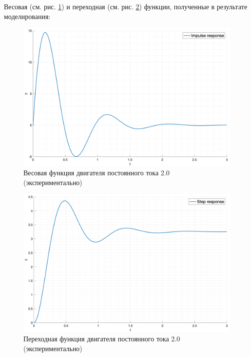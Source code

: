 Весовая (см. рис. \ref{fig:task2_impulse_response_exp}) и переходная (см. рис. \ref{fig:task2_step_response_exp}) функции, полученные в результате моделирования:
\begin{figure}[ht!]
    \centering
    \includegraphics[width=\textwidth]{media/plots/task2_impulse_response_exp.png}
    \caption{Весовая функция двигателя постоянного тока 2.0 (экспериментально)}
    \label{fig:task2_impulse_response_exp}
\end{figure}
\begin{figure}[ht!]
    \centering
    \includegraphics[width=\textwidth]{media/plots/task2_step_response_exp.png}
    \caption{Переходная функция двигателя постоянного тока 2.0 (экспериментально)}
    \label{fig:task2_step_response_exp}
\end{figure}

